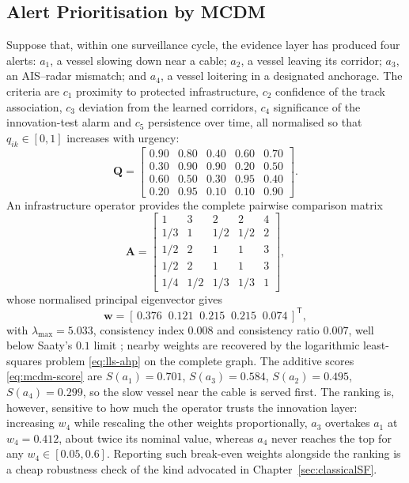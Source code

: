 \subsection{Alert Prioritisation by MCDM}
\label{subsec:maritime-mcdm}
\begin{example}
\label{ex:ch07-maritime-mcdm}
Suppose that, within one surveillance cycle, the evidence layer has produced four alerts: $a_1$, a vessel slowing down near a cable; $a_2$, a vessel leaving its corridor; $a_3$, an AIS--radar mismatch; and $a_4$, a vessel loitering in a designated anchorage. The criteria are $c_1$ proximity to protected infrastructure, $c_2$ confidence of the track association, $c_3$ deviation from the learned corridors, $c_4$ significance of the innovation-test alarm and $c_5$ persistence over time, all normalised so that $q_{ik}\in[0,1]$ increases with urgency:
\begin{equation}
\mathbf{Q}=
\begin{bmatrix}
0.90 & 0.80 & 0.40 & 0.60 & 0.70\\
0.30 & 0.90 & 0.90 & 0.20 & 0.50\\
0.60 & 0.50 & 0.30 & 0.95 & 0.40\\
0.20 & 0.95 & 0.10 & 0.10 & 0.90
\end{bmatrix}.
\end{equation}
An infrastructure operator provides the complete pairwise comparison matrix
\begin{equation}
\mathbf{A}=
\begin{bmatrix}
1 & 3 & 2 & 2 & 4\\
1/3 & 1 & 1/2 & 1/2 & 2\\
1/2 & 2 & 1 & 1 & 3\\
1/2 & 2 & 1 & 1 & 3\\
1/4 & 1/2 & 1/3 & 1/3 & 1
\end{bmatrix},
\end{equation}
whose normalised principal eigenvector gives
\[\mathbf{w}=[\,0.376\;\;0.121\;\;0.215\;\;0.215\;\;0.074\,]^{\mathsf T},\]
with $\lambda_{\max}=5.033$, consistency index $0.008$ and consistency ratio $0.007$, well below Saaty's $0.1$ limit \cite{saaty_analytic_1987}; nearby weights are recovered by the logarithmic least-squares problem \eqref{eq:lls-ahp} on the complete graph. The additive scores \eqref{eq:mcdm-score} are $S(a_1)=0.701$, $S(a_3)=0.584$, $S(a_2)=0.495$, $S(a_4)=0.299$, so the slow vessel near the cable is served first. The ranking is, however, sensitive to how much the operator trusts the innovation layer: increasing $w_4$ while rescaling the other weights proportionally, $a_3$ overtakes $a_1$ at $w_4=0.412$, about twice its nominal value, whereas $a_4$ never reaches the top for any $w_4\in[0.05,0.6]$. Reporting such break-even weights alongside the ranking is a cheap robustness check of the kind advocated in Chapter~\ref{sec:classicalSF}.
\end{example}


